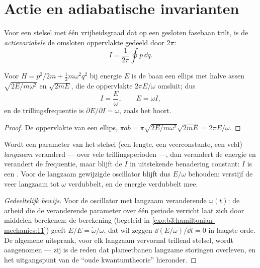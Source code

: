 \section{Actie en adiabatische invarianten}

\begin{definition}[Actievariabele]\label{def:b3:hamiltonian-mechanics:action-variable}
Voor een stelsel met één vrijheidsgraad dat op een gesloten fasebaan
trilt, is de \emph{actievariabele} de omsloten oppervlakte gedeeld door
$2\pi$:
\[
I = \frac{1}{2\pi}\oint p\,\dd q .
\]
\end{definition}

\begin{proposition}\label{prop:b3:hamiltonian-mechanics:sho-action}
Voor $H = p^2/2m + \tfrac12 m\omega^2q^2$ bij energie $E$ is de baan een
ellips met halve assen $\sqrt{2E/m\omega^2}$ en $\sqrt{2mE}$, die de
oppervlakte $2\pi E/\omega$ omsluit; dus
\[
I = \frac{E}{\omega} , \qquad E = \omega I ,
\]
en de trillingsfrequentie is $\partial E/\partial I = \omega$, zoals het
hoort.
\end{proposition}

\begin{proof}
De oppervlakte van een ellips, $\pi ab = \pi\sqrt{2E/m\omega^2}\sqrt{2mE} =
2\pi E/\omega$.
\end{proof}

\begin{proposition}\label{prop:b3:hamiltonian-mechanics:adiabatic}
Wordt een parameter van het stelsel (een lengte, een veerconstante, een
veld) \emph{langzaam} veranderd --- over vele trillingsperioden ---, dan
verandert de energie en verandert de frequentie, maar blijft de  $I$
in uitstekende benadering constant: $I$ is een \emph{}. Voor de langzaam gewijzigde oscillator blijft dus $E/\omega$
behouden: verstijf de veer langzaam tot $\omega$ verdubbelt, en de
energie verdubbelt mee.
\end{proposition}

\begin{proof}[Gedeeltelijk bewijs]
Voor de oscillator met langzaam veranderende $\omega(t)$: de arbeid die
de veranderende parameter over één periode verricht laat zich door
middelen berekenen; de berekening (begeleid in
\cref{exo:b3:hamiltonian-mechanics:11}) geeft $\dot E/E = \dot\omega/\omega$, dat wil zeggen $\dd(E/\omega)/\dd t = 0$ in laagste
orde. De algemene uitspraak, voor elk langzaam vervormd trillend stelsel,
wordt aangenomen --- zij is de reden dat planeetbanen langzame storingen
overleven, en het uitgangspunt van de ``oude kwantumtheorie'' hieronder.
\end{proof}

